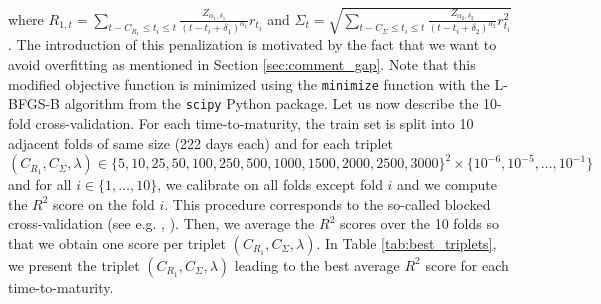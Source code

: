 where $ R_{1,t} = \displaystyle\sum_{t-C_{R_1}\le t_i \le t} \frac{Z_{\alpha_1,\delta_1}}{(t-t_i+\delta_1)^{\alpha_1}} r_{t_i}$ and $\Sigma_{t} = \sqrt{\displaystyle\sum_{t-C_{\Sigma}\le t_i \le t} \frac{Z_{\alpha_2,\delta_2}}{(t-t_i+\delta_2)^{\alpha_2}} r_{t_i}^2}$. The introduction of this penalization is motivated by the fact that we want to avoid overfitting as mentioned in Section \ref{sec:comment_gap}. Note that this modified objective function is minimized using the \texttt{minimize} function with the L-BFGS-B algorithm from the \texttt{scipy} Python package. Let us now describe the 10-fold cross-validation. For each time-to-maturity, the train set is split into 10 adjacent folds of same size (222 days each) and for each triplet $(C_{R_1},C_{\Sigma},\lambda)\in \{5,10,25,50,100,250,500,1000,1500,2000,2500,3000\}^2\times \{10^{-6},10^{-5},\dots,10^{-1}\}$ and for all $i\in \{1,\dots,10\}$, we calibrate on all folds except fold $i$ and we compute the $R^2$ score on the fold $i$. This procedure corresponds to the so-called blocked cross-validation (see e.g. \citeauthor{cerqueira2020evaluating}, \citeyear{cerqueira2020evaluating}). Then, we average the $R^2$ scores over the 10 folds so that we obtain one score per triplet $(C_{R_1},C_{\Sigma},\lambda)$. In Table \ref{tab:best_triplets}, we present the triplet $(C_{R_1},C_{\Sigma},\lambda)$ leading to the best average $R^2$ score for each time-to-maturity. \\

